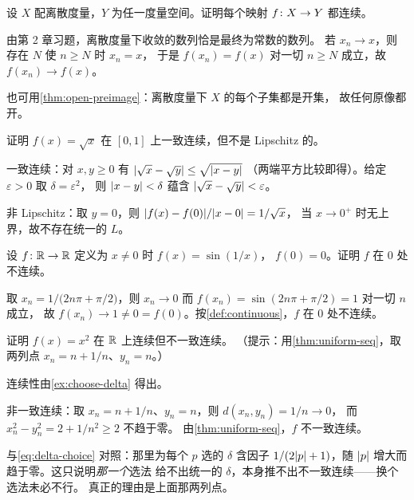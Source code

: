 \begin{exercise}[例行]
  \label{exr:discrete-continuous}
  设 \(X\) 配离散度量，\(Y\) 为任一度量空间。证明每个映射
  \(f \colon X \to Y\) 都连续。
  \begin{solution}
    由第 2 章习题，离散度量下收敛的数列恰是最终为常数的数列。
    若 \(x_{n} \to x\)，则存在 \(N\) 使 \(n \ge N\) 时 \(x_{n}=x\)，
    于是 \(f(x_{n})=f(x)\) 对一切 \(n \ge N\) 成立，故 \(f(x_{n}) \to f(x)\)。

    也可用\cref{thm:open-preimage}：离散度量下 \(X\) 的每个子集都是开集，
    故任何原像都开。
  \end{solution}
\end{exercise}

\begin{exercise}[例行]
  \label{exr:sqrt-uniform}
  证明 \(f(x)=\sqrt{x}\) 在 \([0,1]\) 上一致连续，但不是 Lipschitz 的。
  \begin{solution}
    一致连续：对 \(x,y \ge 0\) 有 \(\lvert\sqrt{x}-\sqrt{y}\rvert \le \sqrt{\lvert x-y\rvert}\)
    （两端平方比较即得）。给定 \(\varepsilon>0\) 取 \(\delta=\varepsilon^{2}\)，
    则 \(\lvert x-y\rvert<\delta\) 蕴含 \(\lvert\sqrt{x}-\sqrt{y}\rvert < \varepsilon\)。

    非 Lipschitz：取 \(y=0\)，则 \(\lvert f(x)-f(0)\rvert/\lvert x-0\rvert = 1/\sqrt{x}\)，
    当 \(x \to 0^{+}\) 时无上界，故不存在统一的 \(L\)。
  \end{solution}
\end{exercise}

\begin{exercise}[例行]
  \label{exr:discontinuous-point}
  设 \(f \colon \mathbb{R} \to \mathbb{R}\) 定义为 \(x \neq 0\) 时 \(f(x)=\sin(1/x)\)，
  \(f(0)=0\)。证明 \(f\) 在 \(0\) 处不连续。
  \begin{solution}
    取 \(x_{n} = 1/\bigl(2n\pi + \pi/2\bigr)\)，则 \(x_{n} \to 0\)
    而 \(f(x_{n}) = \sin(2n\pi+\pi/2) = 1\) 对一切 \(n\) 成立，
    故 \(f(x_{n}) \to 1 \neq 0 = f(0)\)。按\cref{def:continuous}，\(f\) 在 \(0\) 处不连续。
  \end{solution}
\end{exercise}

\begin{exercise}[例行]
  \label{exr:x2-not-uniform}
  证明 \(f(x)=x^{2}\) 在 \(\mathbb{R}\) 上连续但不一致连续。
  （提示：用\cref{thm:uniform-seq}，取两列点 \(x_{n}=n+1/n\)、\(y_{n}=n\)。）
  \begin{solution}
    连续性由\cref{ex:choose-delta} 得出。

    非一致连续：取 \(x_{n}=n+1/n\)、\(y_{n}=n\)，则 \(d(x_{n},y_{n})=1/n \to 0\)，
    而 \(x_{n}^{2}-y_{n}^{2} = 2 + 1/n^{2} \ge 2\) 不趋于零。
    由\cref{thm:uniform-seq}，\(f\) 不一致连续。

    与\cref{eq:delta-choice} 对照：那里为每个 \(p\) 选的 \(\delta\) 含因子
    \(1/(2\lvert p\rvert+1)\)，随 \(\lvert p\rvert\) 增大而趋于零。这只说明\emph{那一个}选法
    给不出统一的 \(\delta\)，本身推不出不一致连续——换个选法未必不行。
    真正的理由是上面那两列点。
  \end{solution}
\end{exercise}

